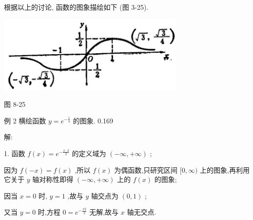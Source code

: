 \documentclass[lang=cn,newtx,12pt,scheme=chinese]{elegantbook}
\begin{document}
\begin{center}
\end{center}

根据以上的讨论, 函数的图象描绘如下 (图 3-25).

\begin{center}
\includegraphics[max width=0.7\textwidth]{images/01912c18-5c3f-733d-b775-749ba9897a9d_172_655401.jpg}
\end{center}

图 8-25

例 2 横绘函数 \(y = {e}^{-\frac{1}{4}}\) 的图象. 0.169

解:

1. 函数 \(f\left( x\right) = {e}^{-\frac{x \cdot 2}{2}}\) 的定义域为 \(\left( {-\infty , + \infty }\right)\) ;

因为 \(f\left( {-x}\right) = f\left( x\right)\) ,所以 \(f\left( x\right)\) 为偶函数,只研究区间 \(\lbrack 0,\infty )\) 上的图象,再利用它关于 \(y\) 轴对称性即得 \(\left( {-\infty , + \infty }\right)\) 上的 \(f\left( x\right)\) 的图象;

因当 \(x = 0\) 时, \(y = 1\) ,故与 \(y\) 轴交点为 \(\left( {0,1}\right)\) ;

又当 \(y = 0\) 时,方程 \(0 = {e}^{-\frac{x2}{2}}\) 无解,故与 \(x\) 轴无交点.
\end{document}
